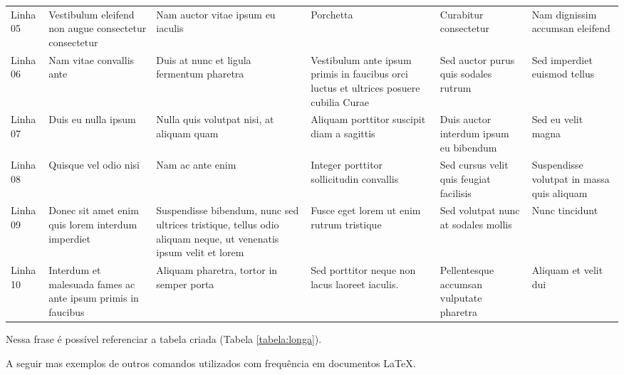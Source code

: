 {\begin{longtable}{ M{.10\textwidth}  M{.15\textwidth}  M{.16\textwidth}  M{.15\textwidth}  M{.16\textwidth}  M{.12\textwidth} }
		Linha 05 & Vestibulum eleifend non augue consectetur consectetur & Nam auctor vitae ipsum eu iaculis &  Porchetta & Curabitur consectetur & Nam dignissim accumsan eleifend \\
		
		Linha 06 & Nam vitae convallis ante & Duis at nunc et ligula fermentum pharetra &  Vestibulum ante ipsum primis in faucibus orci luctus et ultrices posuere cubilia Curae & Sed auctor purus quis sodales rutrum & Sed imperdiet euismod tellus \\
		
		Linha 07 & Duis eu nulla ipsum & Nulla quis volutpat nisi, at aliquam quam &  Aliquam porttitor suscipit diam a sagittis & Duis auctor interdum ipsum eu bibendum & Sed eu velit magna \\
		
		Linha 08 & Quisque vel odio nisi & Nam ac ante enim &  Integer porttitor sollicitudin convallis & Sed cursus velit quis feugiat facilisis & Suspendisse volutpat in massa quis aliquam \\
		
		Linha 09 & Donec sit amet enim quis lorem interdum imperdiet & Suspendisse bibendum, nunc sed ultrices tristique, tellus odio aliquam neque, ut venenatis ipsum velit et lorem &  Fusce eget lorem ut enim rutrum tristique & Sed volutpat nunc at sodales mollis & Nunc tincidunt \\
		
		Linha 10 & Interdum et malesuada fames ac ante ipsum primis in faucibus & Aliquam pharetra, tortor in semper porta &  Sed porttitor neque non lacus laoreet iaculis. & Pellentesque accumsan vulputate pharetra & Aliquam et velit dui \\ \toprule
		
		\end{longtable}
}

Nessa frase é possível referenciar a tabela criada (Tabela \ref{tabela:longa}).

A seguir mas exemplos de outros comandos utilizados com frequência em documentos LaTeX.